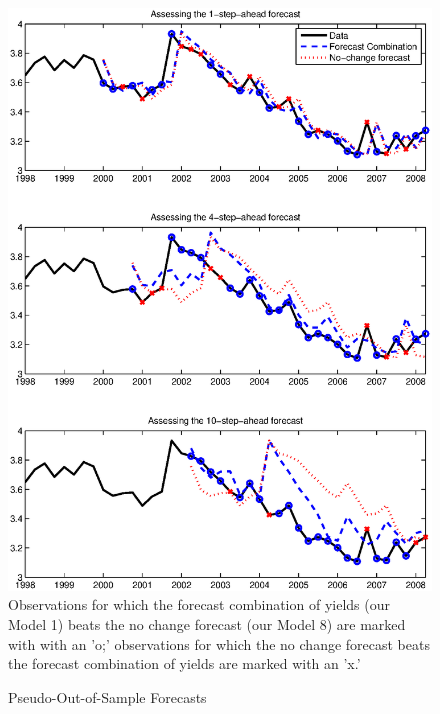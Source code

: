\documentclass[11pt]{article}
\renewcommand{\baselinestretch}{1.5}
\begin{document}
\clearpage
\begin{figure} 
\caption{Pseudo-Out-of-Sample Forecasts} \label{figure_forecasts}
\center \includegraphics[scale=0.75]{figure_forecasts.ps}
\flushleft 
\renewcommand{\baselinestretch}{1} \normalsize 
\footnotesize \noindent Observations for which the forecast combination of yields (our Model 1) beats the no change forecast (our Model 8) are marked with with an 'o;' observations for which the no change forecast beats the forecast combination of yields are marked with an 'x.'
\end{figure}
\end{document}
